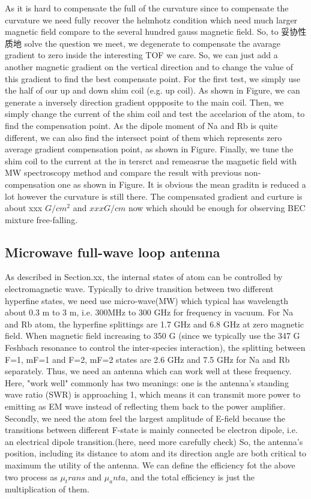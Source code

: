 As it is hard to compensate the full of the curvature since to compensate the curvature we need fully recover the helmhotz condition which need much larger magnetic field compare to the several hundred gauss magnetic field. So, to 妥协性质地 solve the question we meet, we degenerate to compensate the avarage gradient to zero inside the interesting TOF we care. So, we can just add a another magnetic gradient on the vertical direction and to change the value of this gradient to find the best compensate point. For the first test, we simply use the half of our up and down shim coil (e.g. up coil). As shown in Figure, we can generate a inversely direction gradient oppposite to the main coil. Then, we simply change the current of the shim coil and test the accelarion of the atom, to find the compensation point. As the dipole moment of Na and Rb is quite different, we can also find the intersect point of them which represents zero average gradient compensation point, as shown in Figure. Finally, we tune the shim coil to the current at the in tersrct and remeasrue the magnetic field with MW spectroscopy method and compare the result with previous non-compensation one as shown in Figure. It is obvious the mean graditn is reduced a lot however the curvature is still there. The compensated gradient and curture is about xxx \(G/cm^2\) and \(xxx G/cm\) now which should be enough for observing BEC mixture free-falling. 


\subsection{Microwave full-wave loop antenna}
As described in Section.xx, the internal states of atom can be controlled by electromagnetic wave. Typically to drive transition between two different hyperfine states, we need use micro-wave(MW) which typical has wavelength about 0.3 m to 3 m, i.e. 300MHz to 300 GHz for frequency in vacuum. For Na and Rb atom, the hyperfine splittings are 1.7 GHz and 6.8 GHz at zero magnetic field. When magnetic field increasing to 350 G (since we typically use the 347 G Feshbach resonance to control the inter-species interaction), the splitting between F=1, mF=1 and F=2, mF=2 states are 2.6 GHz and 7.5 GHz for Na and Rb separately. Thus, we need an antenna which can work well at these frequency. Here, "work well" commonly has two meanings: one is the antenna's standing wave ratio (SWR) is approaching 1, which means it can transmit more power to emitting as EM wave instead of reflecting them back to the power amplifier. Secondly, we need the atom feel the largest amplitude of E-field because the transitions between different F-state is mainly connected be electron dipole, i.e. an electrical dipole transition.(here, need more carefully check) So, the antenna's position, including its distance to atom and its direction angle are both critical to maximum the utility of the antenna. We can define the efficiency fot the above two process as $\mu_trans$ and $\mu_anta$, and the total efficiency is just the multiplication of them.

